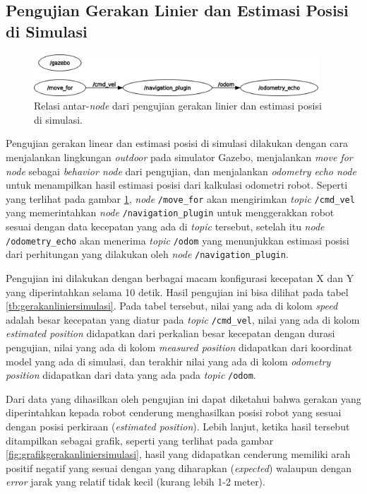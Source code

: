 \subsection{Pengujian Gerakan Linier dan Estimasi Posisi di Simulasi}
\label{subsec:liniersimulasi}

\begin{figure}[ht]
  \centering
  \includegraphics[width=0.95\textwidth,keepaspectratio]{gambar/rosgraph-navigation-plugin.png}
  \caption{Relasi antar-\emph{node} dari pengujian gerakan linier dan estimasi posisi di simulasi.}
  \label{fig:rosgraphnavigationplugin}
\end{figure}

Pengujian gerakan linear dan estimasi posisi di simulasi dilakukan dengan cara menjalankan lingkungan \emph{outdoor} pada simulator Gazebo,
  menjalankan \emph{move for node} sebagai \emph{behavior node} dari pengujian,
  dan menjalankan \emph{odometry echo node} untuk menampilkan hasil estimasi posisi dari kalkulasi odometri robot.
Seperti yang terlihat pada gambar \ref{fig:rosgraphnavigationplugin},
  \emph{node} \lstinline{/move_for} akan mengirimkan \emph{topic} \lstinline{/cmd_vel} yang memerintahkan \emph{node} \lstinline{/navigation_plugin} untuk menggerakkan robot sesuai dengan data kecepatan yang ada di \emph{topic} tersebut,
  setelah itu \emph{node} \lstinline{/odometry_echo} akan menerima \emph{topic} \lstinline{/odom} yang menunjukkan estimasi posisi dari perhitungan yang dilakukan oleh \emph{node} \lstinline{/navigation_plugin}.



Pengujian ini dilakukan dengan berbagai macam konfigurasi kecepatan X dan Y yang diperintahkan selama 10 detik.
Hasil pengujian ini bisa dilihat pada tabel \ref{tb:gerakanliniersimulasi}.
Pada tabel tersebut, nilai yang ada di kolom \emph{speed} adalah besar kecepatan yang diatur pada \emph{topic} \lstinline{/cmd_vel},
  nilai yang ada di kolom \emph{estimated position} didapatkan dari perkalian besar kecepatan dengan durasi pengujian,
  nilai yang ada di kolom \emph{measured position} didapatkan dari koordinat model yang ada di simulasi,
  dan terakhir nilai yang ada di kolom \emph{odometry position} didapatkan dari data yang ada pada \emph{topic} \lstinline{/odom}.

Dari data yang dihasilkan oleh pengujian ini dapat diketahui bahwa gerakan yang diperintahkan kepada robot cenderung menghasilkan posisi robot yang sesuai dengan posisi perkiraan (\emph{estimated position}).
Lebih lanjut, ketika hasil tersebut ditampilkan sebagai grafik,
  seperti yang terlihat pada gambar \ref{fig:grafikgerakanliniersimulasi},
  hasil yang didapatkan cenderung memiliki arah positif negatif yang sesuai dengan yang diharapkan (\emph{expected}) walaupun dengan \emph{error} jarak yang relatif tidak kecil (kurang lebih 1-2 meter).


